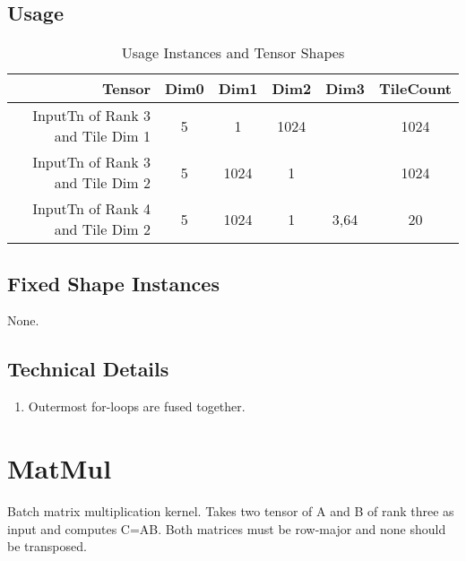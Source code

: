 \documentclass[•]{article}
\begin{document}
\subsection{Usage}
\begin{table}[htbp] %
\caption{Usage Instances and Tensor Shapes}
	\begin{center}
		\begin{tabular}{|r|c|c|c|c|c|} 
		\hline	
		Tensor & Dim0 & Dim1 & Dim2 & Dim3 & TileCount\\ 
		\hline	
		InputTn of Rank 3 and Tile Dim 1&
			5 &
			1 &
			1024 &
			  &
			1024\\ 
		\hline	
		InputTn of Rank 3 and Tile Dim 2&
			5 &
			1024 &
			1 &
			  &
			1024\\ 
		\hline 
		InputTn of Rank 4 and Tile Dim 2&
			5 &
			1024 &
			1 &
			3,64&
			20 \\ 
		\hline
		\end{tabular}
	\end{center}
\end{table}


\subsection{Fixed Shape Instances}
None.

\subsection{Technical Details}
\begin{enumerate}
\item Outermost for-loops are fused together.
\end{enumerate}












\pagebreak












\section{MatMul}
Batch matrix multiplication kernel. Takes two tensor of A and B of rank three as input and computes C=AB. Both matrices must be row-major and none should be transposed.
\end{document}

